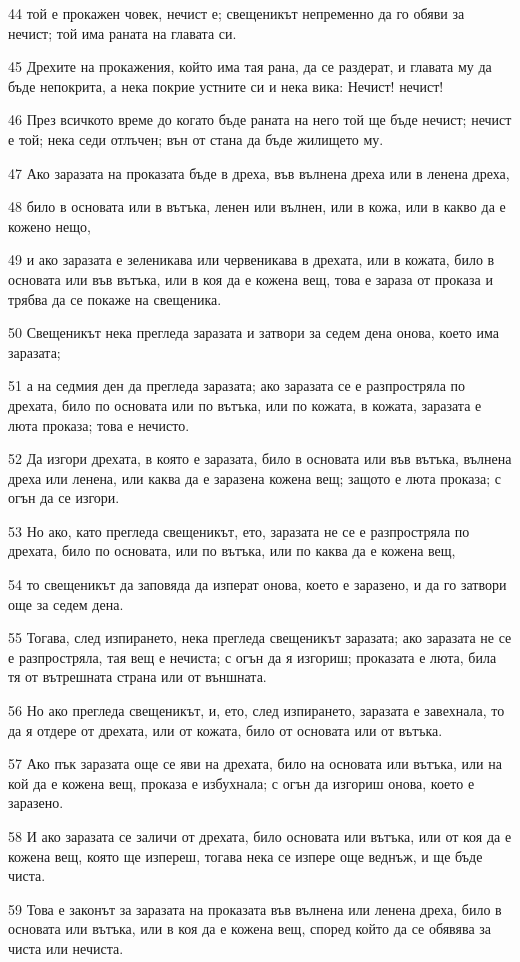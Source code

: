 \par 44 той е прокажен човек, нечист е; свещеникът непременно да го обяви за нечист; той има раната на главата си.
\par 45 Дрехите на прокажения, който има тая рана, да се раздерат, и главата му да бъде непокрита, а нека покрие устните си и нека вика: Нечист! нечист!
\par 46 През всичкото време до когато бъде раната на него той ще бъде нечист; нечист е той; нека седи отлъчен; вън от стана да бъде жилището му.
\par 47 Ако заразата на проказата бъде в дреха, във вълнена дреха или в ленена дреха,
\par 48 било в основата или в вътъка, ленен или вълнен, или в кожа, или в какво да е кожено нещо,
\par 49 и ако заразата е зеленикава или червеникава в дрехата, или в кожата, било в основата или във вътъка, или в коя да е кожена вещ, това е зараза от проказа и трябва да се покаже на свещеника.
\par 50 Свещеникът нека прегледа заразата и затвори за седем дена онова, което има заразата;
\par 51 а на седмия ден да прегледа заразата; ако заразата се е разпростряла по дрехата, било по основата или по вътъка, или по кожата, в кожата, заразата е люта проказа; това е нечисто.
\par 52 Да изгори дрехата, в която е заразата, било в основата или във вътъка, вълнена дреха или ленена, или каква да е заразена кожена вещ; защото е люта проказа; с огън да се изгори.
\par 53 Но ако, като прегледа свещеникът, ето, заразата не се е разпростряла по дрехата, било по основата, или по вътъка, или по каква да е кожена вещ,
\par 54 то свещеникът да заповяда да изперат онова, което е заразено, и да го затвори още за седем дена.
\par 55 Тогава, след изпирането, нека прегледа свещеникът заразата; ако заразата не се е разпростряла, тая вещ е нечиста; с огън да я изгориш; проказата е люта, била тя от вътрешната страна или от външната.
\par 56 Но ако прегледа свещеникът, и, ето, след изпирането, заразата е завехнала, то да я отдере от дрехата, или от кожата, било от основата или от вътъка.
\par 57 Ако пък заразата още се яви на дрехата, било на основата или вътъка, или на кой да е кожена вещ, проказа е избухнала; с огън да изгориш онова, което е заразено.
\par 58 И ако заразата се заличи от дрехата, било основата или вътъка, или от коя да е кожена вещ, която ще изпереш, тогава нека се изпере още веднъж, и ще бъде чиста.
\par 59 Това е законът за заразата на проказата във вълнена или ленена дреха, било в основата или вътъка, или в коя да е кожена вещ, според който да се обявява за чиста или нечиста.

